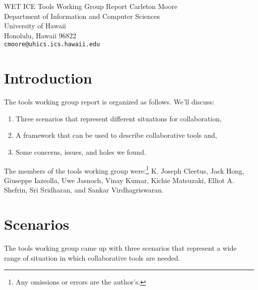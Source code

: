 

\pagestyle{empty}



\makeieeetitle
{WET ICE Tools Working Group Report}
{Carleton Moore\\
Department of Information and Computer Sciences\\ 
University of Hawaii\\
Honolulu, Hawaii 96822\\ 
{\tt cmoore@uhics.ics.hawaii.edu}}


\section{Introduction}

The tools working group report is organized as follows.  We'll discuss:
\begin{enumerate} 
\item Three scenarios that represent different situations for collaboration,
\item A framework that can be used to describe collaborative tools and,
\item Some concerns, issues, and holes we found.
\end{enumerate}

The members of the tools working group were:\footnote{Any omissions or
errors are the author's.} K. Joseph Cleetus, Jack Hong, Giuseppe Iazeolla,
Uwe Jasnoch, Vinay Kumar, Kichie Matsuzaki, Elliot A. Shefrin, Sri
Sridharan, and Sankar Virdhagriswaran.


\section{Scenarios}

The tools working group came up with three scenarios that represent a wide
range of situation in which collaborative tools are needed.  

